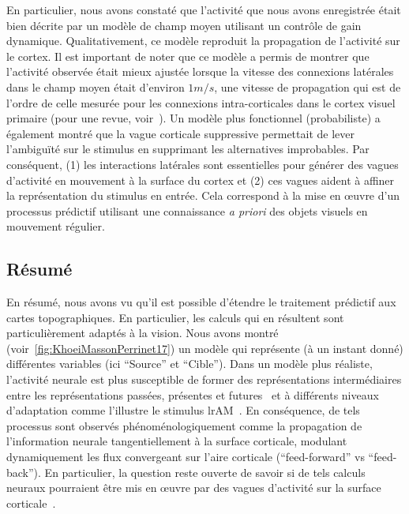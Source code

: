 En particulier, nous avons constaté que l'activité que nous avons
enregistrée était bien décrite par un modèle de champ moyen utilisant un
contrôle de gain dynamique. Qualitativement, ce modèle reproduit la
propagation de l'activité sur le cortex. Il est important de noter que
ce modèle a permis de montrer que l'activité observée était mieux
ajustée lorsque la vitesse des connexions latérales dans le champ moyen
était d'environ $1 m/s$, une vitesse de propagation qui est de l'ordre de
celle mesurée pour les connexions intra-corticales dans le cortex visuel
primaire (pour une revue, voir~\citep{Muller18}). Un modèle plus
fonctionnel (probabiliste) a également montré que la vague
corticale suppressive permettait de lever l'ambiguïté sur le stimulus en supprimant
les alternatives improbables. Par conséquent,
(1) les interactions latérales sont essentielles pour générer des vagues d'activité
en mouvement à la surface du cortex et (2) ces vagues aident à affiner la représentation
du stimulus en entrée. Cela correspond à la mise en œuvre d'un processus
prédictif utilisant une connaissance \emph{a priori} des objets visuels
en mouvement régulier.

\subsection{Résumé}
En résumé, nous avons vu qu'il est possible d'étendre le traitement
prédictif aux cartes topographiques. En particulier, les calculs qui en
résultent sont particulièrement adaptés à la vision. Nous avons montré
(voir~\ref{fig:KhoeiMassonPerrinet17}) un modèle qui représente (à un instant donné) différentes
variables (ici ``Source'' et ``Cible''). Dans un modèle plus réaliste,
l'activité neurale est plus susceptible de former des représentations
intermédiaires entre les représentations passées, présentes et futures~\citep{Glaser18} et à différents niveaux d'adaptation comme
l'illustre le stimulus lrAM~\citep{Chemla19}. En conséquence, de
tels processus sont observés phénoménologiquement comme la propagation
de l'information neurale tangentiellement à la surface corticale,
modulant dynamiquement les flux convergeant sur l'aire corticale (``feed-forward'' vs ``feed-back''). En
particulier, la question reste ouverte de savoir si de tels calculs
neuraux pourraient être mis en œuvre par des vagues d'activité sur la
surface corticale~\citep{Muller18}.

